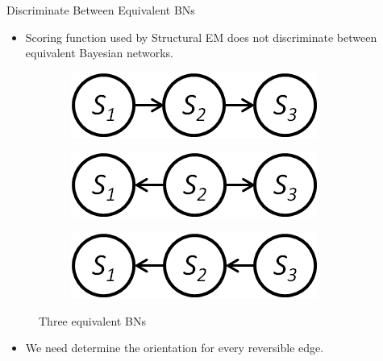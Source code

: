 \documentclass[hyperref={pdfpagelabels=false}]{beamer}
\begin{document}
\begin{frame}{Discriminate Between Equivalent BNs}

	\begin{itemize}
		\item Scoring function used by Structural EM does not discriminate between equivalent Bayesian networks.
	\end{itemize}
			
	\begin{figure}[!ht]\small
		\centering
		\begin{subfigure}[t]{0.3\linewidth}
			\centering
			\includegraphics[width=0.9\linewidth]{figures/s1s2s3.png}
			\caption{\label{fig:equivnet1_b}}
		\end{subfigure}
		\begin{subfigure}[t]{0.3\linewidth}
			\centering
			\includegraphics[width=0.9\linewidth]{figures/s2s1s3.png}
			\caption{\label{fig:equivnet2_b}}
		\end{subfigure}
		\begin{subfigure}[t]{0.3\linewidth}
			\centering
			\includegraphics[width=0.9\linewidth]{figures/s3s2s1.png}
			\caption{\label{fig:equivnet3_b}}			
		\end{subfigure}		
		\caption{Three equivalent BNs \label{fig:equivnets_b} }
	\end{figure}

	\begin{itemize}
		\item We need determine the orientation for every reversible edge.
	\end{itemize}
		
\end{frame}
\end{document}
